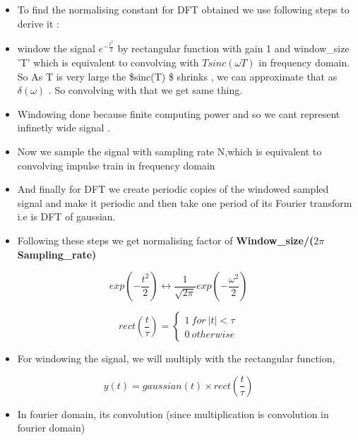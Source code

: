 \documentclass[11pt]{article}
\providecommand{\tightlist}{%
      \setlength{\itemsep}{0pt}\setlength{\parskip}{0pt}}
\begin{document}
\begin{itemize}
\tightlist
\item
  To find the normalising constant for DFT obtained we use following
  steps to derive it :
\item
  window the signal \(e^{-\frac{t^{2}}{2}}\) by rectangular function
  with gain 1 and window\_size 'T' which is equivalent to convolving
  with \(Tsinc(\omega T)\) in frequency domain. So As T is very large
  the \$sinc(\omega T) \$ shrinks , we can approximate that as
  \(\delta(\omega)\) . So convolving with that we get same thing.
\item
  Windowing done because finite computing power and so we cant represent
  infinetly wide signal .
\item
  Now we sample the signal with sampling rate N,which is equivalent to
  convolving impulse train in frequency domain
\item
  And finally for DFT we create periodic copies of the windowed sampled
  signal and make it periodic and then take one period of its Fourier
  transform i.e is DFT of gaussian.
\item
  Following these steps we get normalising factor of
  \textbf{Window\_size/(\(2 \pi \ \)Sampling\_rate)}
\end{itemize}

\begin{equation}
exp({-\frac{t^2}{2}}) \longleftrightarrow \frac{1}{\sqrt{2\pi}}exp({-\frac{\omega^2}{2}})
\end{equation}

\begin{equation}
rect(\frac{t}{\tau}) =
\begin{cases}
1\  for\ |t| < \tau \\
0\ otherwise
\end{cases}
\end{equation}

\begin{itemize}
\tightlist
\item
  For windowing the signal, we will multiply with the rectangular
  function,
\end{itemize}

\begin{equation}
y(t) = gaussian(t) \times rect(\frac{t}{\tau})
\end{equation}

\begin{itemize}
\tightlist
\item
  In fourier domain, its convolution (since multiplication is
  convolution in fourier domain)
\end{itemize}
\end{document}
